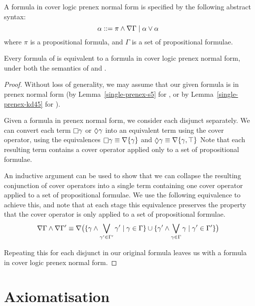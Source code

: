\begin{definition}
A formula in cover logic prenex normal form is specified by the following
abstract syntax: 
$$\alpha ::= \pi \land \nabla \Gamma \mid \alpha \lor \alpha$$
where $\pi$ is a propositional formula, and $\Gamma$ is a set of propositional
formulae.
\end{definition}

\begin{lemma}\label{single-cover-prenex}
Every formula of \langi{} is equivalent to a formula in cover logic prenex normal
form, under both the semantics of \logicSi{} and \logicKDi{}.
\end{lemma}

\begin{proof}
Without loss of generality, we may assume that our given formula is in prenex
normal form (by Lemma~\ref{single-prenex-s5} for \logicSi{}, or by
Lemma~\ref{single-prenex-kd45} for \logicKDi{}).

Given a formula in prenex normal form, we consider each disjunct separately. We
can convert each term $\knows \gamma$ or $\suspects \gamma$ into an equivalent
term using the cover operator, using the equivalences $\knows \gamma \equiv
\covers \{ \gamma \}$ and $\suspects \gamma \equiv \covers \{ \gamma, \top \}$ 
Note that each resulting term contains a cover operator applied only to
a set of propositional formulae.

An inductive argument can be used to show that we can collapse the resulting
conjunction of cover operators into a single term containing one cover
operator applied to a set of propositional formulae. We use the following
equivalence to achieve this, and note that at each stage this equivalence
preserves the property that the cover operator is only applied to a set of
propositional formulae.
$$
\nabla \Gamma \land \nabla \Gamma' \equiv 
\nabla \big( 
\{ \gamma \land \bigvee_{\gamma' \in \Gamma'} \gamma' \mid \gamma \in \Gamma \}
\cup
\{ \gamma' \land \bigvee_{\gamma \in \Gamma} \gamma \mid \gamma' \in \Gamma' \}
\big)
$$

Repeating this for each disjunct in our original formula leaves us with a
formula in cover logic prenex normal form.
\end{proof}

\section{Axiomatisation}


